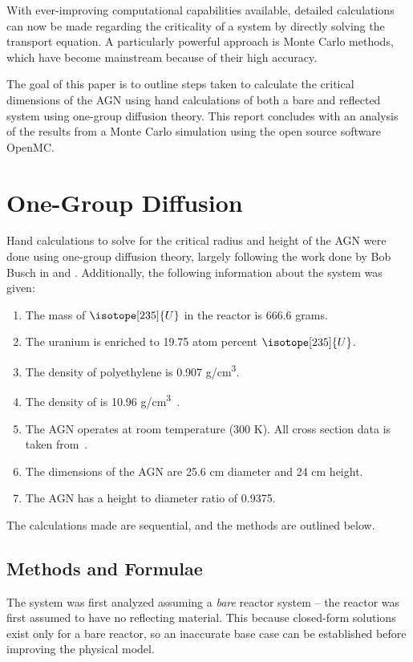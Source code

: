 \documentclass{anstrans}
\begin{document}
    With ever-improving computational capabilities available, detailed calculations can now be made regarding the criticality of a system by directly solving the transport equation.
    A particularly powerful approach is Monte Carlo methods, which have become mainstream because of their high accuracy.

    The goal of this paper is to outline steps taken to calculate the critical dimensions of the AGN using hand calculations of both a bare and reflected system using one-group diffusion theory.
    This report concludes with an analysis of the results from a Monte Carlo simulation using the open source software OpenMC.


    \section{One-Group Diffusion}
    Hand calculations to solve for the critical radius and height of the AGN were done using one-group diffusion theory, largely following the work done by Bob Busch in \cite{buschAnalyticalCalculationsAGN} and \cite{bowenHandCalculationMethods2023}.
    Additionally, the following information about the system was given:
    \begin{enumerate}
        \item The mass of $\isotope[235]{U}$ in the reactor is 666.6 grams.
        \item The uranium is enriched to 19.75 atom percent $\isotope[235]{U}$.
        \item The density of polyethylene is 0.907 g/cm\textsuperscript{3}.
        \item The density of  is 10.96 g/cm\textsuperscript{3}~\cite{CompositionURANIUMOXIDE}.
        \item The AGN operates at room temperature (300 K). All cross section data is taken from~\cite{brownENDFBVIII082018}.
        \item The dimensions of the AGN are 25.6 cm diameter and 24 cm height.
        \item The AGN has a height to diameter ratio of 0.9375.
    \end{enumerate}
    The calculations made are sequential, and the methods are outlined below.

    \subsection{Methods and Formulae}
    The system was first analyzed assuming a \textit{bare} reactor system -- the reactor was first assumed to have no reflecting material.
    This because closed-form solutions exist only for a bare reactor, so an inaccurate base case can be established before improving the physical model.
\end{document}
